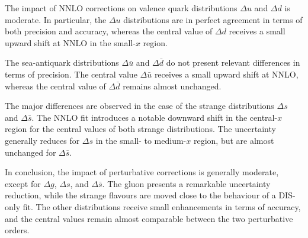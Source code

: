 The impact of NNLO corrections on valence quark distributions $\Delta u$ and $\Delta d$ is moderate. In particular, the $\Delta u$ distributions are in perfect agreement in terms of both precision and accuracy, whereas the central value of $\Delta d$ receives a small upward shift at NNLO in the small-$x$ region.%

The sea-antiquark distributions $\Delta \bar{u}$ and $\Delta \bar{d}$ do not present relevant differences in terms of precision. The central value $\Delta \bar{u}$ receives a small upward shift at NNLO, whereas the central value of $\Delta \bar{d}$ remains almost unchanged.%

The major differences are observed in the case of the strange distributions $\Delta s$ and $\Delta \bar{s}$. The NNLO fit introduces a notable downward shift in the central-$x$ region for the central values of both strange distributions. The uncertainty generally reduces for $\Delta s$ in the small- to medium-$x$ region, but are almost unchanged for $\Delta \bar{s}$.%

In conclusion, the impact of perturbative corrections is generally moderate, except for $\Delta g$, $\Delta s$, and $\Delta \bar{s}$. The gluon presents a remarkable uncertainty reduction, while the strange flavours are moved close to the behaviour of a DIS-only fit. The other distributions receive small enhancements in terms of accuracy, and the central values remain almost comparable between the two perturbative orders.

